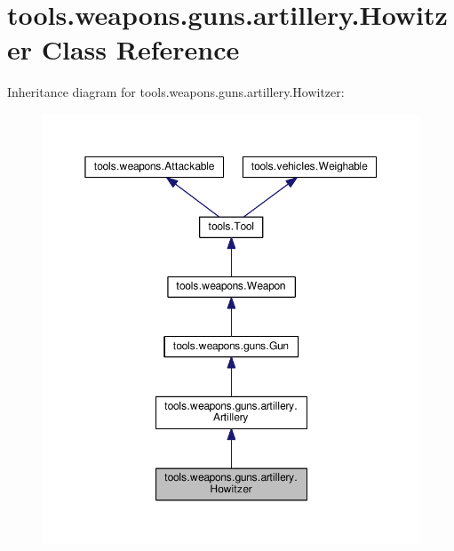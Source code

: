 \hypertarget{classtools_1_1weapons_1_1guns_1_1artillery_1_1_howitzer}{}\section{tools.\+weapons.\+guns.\+artillery.\+Howitzer Class Reference}
\label{classtools_1_1weapons_1_1guns_1_1artillery_1_1_howitzer}


Inheritance diagram for tools.\+weapons.\+guns.\+artillery.\+Howitzer\+:
\nopagebreak
\begin{figure}[H]
\begin{center}
\leavevmode
\includegraphics[width=350pt]{classtools_1_1weapons_1_1guns_1_1artillery_1_1_howitzer__inherit__graph}
\end{center}
\end{figure}


